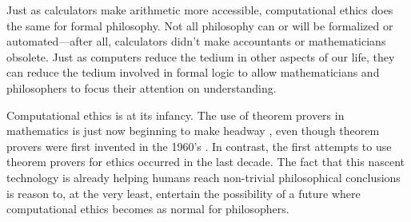 \begin{isabellebody}
\begin{isamarkuptext}
Just as calculators make arithmetic more accessible, computational ethics does the same for formal philosophy. 
Not all philosophy can or will 
be formalized or automated—after all, calculators didn't make accountants or mathematicians obsolete. Just as computers 
reduce the tedium in other aspects of our life, they can reduce the tedium involved in formal logic to 
allow mathematicians and philosophers to focus their attention on understanding.%
\end{isamarkuptext}\isamarkuptrue%
%
\isadelimdocument
%
\endisadelimdocument
%
\isatagdocument
%
\isamarkuptrue%
%
\endisatagdocument
{\isafolddocument}%
%
\isadelimdocument
%
\endisadelimdocument
%
\begin{isamarkuptext}%
Computational ethics is at its infancy. The use of theorem provers in mathematics is just now beginning 
to make headway \cite{buzzardvideo}, even though theorem provers were first invented in the 1960's \cite{historyofITP}. In contrast, the first attempts to use theorem 
provers for ethics occurred in the last decade. The fact that this nascent technology is already 
helping humans reach non-trivial philosophical conclusions is reason to, at the very least, entertain 
the possibility of a future where computational ethics becomes as normal for philosophers.


\end{isamarkuptext}
\end{isabellebody}

